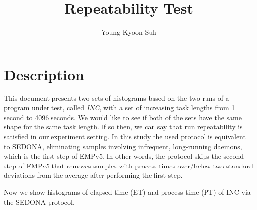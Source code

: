 \documentclass[10pt]{article}
\begin{document}
\title{Repeatability Test}

\author{
Young-Kyoon Suh\\
}
\maketitle

\section{Description}
This document presents two sets of histograms based on the two runs 
of a program under test, called {\em INC}, with a set of increasing task lengths 
from 1 second to 4096 seconds.
We would like to see if both of the sets have the same shape for the same task length.
If so then, we can say that run repeatability is satisfied in our experiment setting. 
In this study the used protocol is equivalent to SEDONA, eliminating samples involving infrequent, long-running daemons, which is the first step of EMPv5. In other words, the protocol skips the second step 
of EMPv5 that removes samples with process times over/below two standard deviations 
from the average after performing the first step.

Now we show histograms of elapsed time (ET) and process time (PT) of INC via the SEDONA protocol.

\pagebreak



\pagebreak
\newpage



\pagebreak
\newpage



\pagebreak
\newpage


\end{document}
